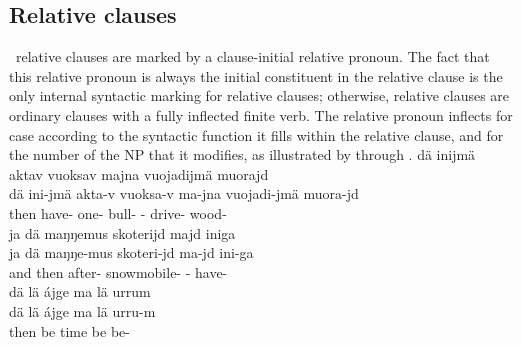 \subsection{Relative clauses}\label{relativeClauses}
\PS\ relative clauses are marked by a clause-initial relative pronoun. The fact that this relative pronoun  
is always the initial constituent in the relative clause is the only internal syntactic marking for relative clauses; otherwise, relative clauses are ordinary clauses with a fully inflected finite verb. %
The relative pronoun %
inflects for case according to the syntactic function it fills within the relative clause, and for the number of the NP that it modifies, as illustrated by  through .
\ea\label{relClause1}%
\glll	dä inijmä aktav vuoksav majna vuojadijmä muorajd\\
	dä ini-jmä akta-v vuoksa-v ma-jna vuojadi-jmä muora-jd\\
	then have- one- bull- - drive- wood-\\\nopagebreak
{} 
\z
\ea\label{relClause2}%
\glll	ja dä maŋŋemus skoterijd majd iniga\\
	ja dä maŋŋe-mus skoteri-jd ma-jd ini-ga\\
	and then after- snowmobile- - have-\\\nopagebreak
{} 
\z
\ea\label{relClause3}%
\glll	dä lä ájge ma lä urrum\\
	dä lä ájge ma lä urru-m \\
	then be\BS{} time\BS{} \BS{} be\BS{} be-\\\nopagebreak
{} 
\z

